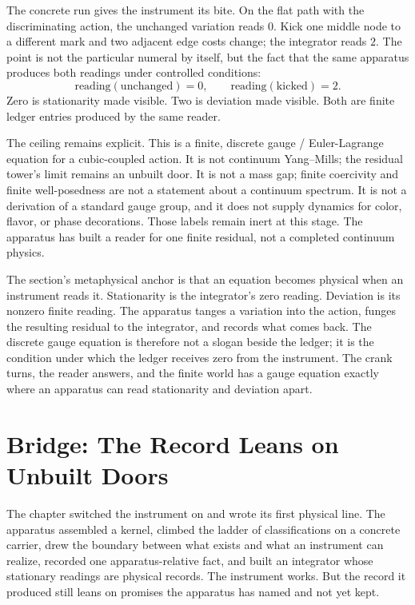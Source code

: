 The concrete run gives the instrument its bite. On the flat path with the
discriminating action, the unchanged variation reads \(0\). Kick one middle
node to a different mark and two adjacent edge costs change; the
integrator reads \(2\). The point is not the particular numeral by itself, but
the fact that the same apparatus produces both readings under controlled
conditions:
\[
  \mathrm{reading}(\mathrm{unchanged})=0,
  \qquad
  \mathrm{reading}(\mathrm{kicked})=2.
\]
Zero is stationarity made visible. Two is deviation made visible. Both are
finite ledger entries produced by the same reader.

The ceiling remains explicit. This is a finite, discrete gauge /
Euler-Lagrange equation for a cubic-coupled action. It is not continuum
Yang--Mills; the residual tower's limit remains an unbuilt door. It is not a
mass gap; finite coercivity and finite well-posedness are not a statement about
a continuum spectrum. It is not a derivation of a standard gauge group, and it
does not supply dynamics for color, flavor, or phase decorations. Those labels
remain inert at this stage. The apparatus has built a reader for one finite
residual, not a completed continuum physics.

The section's metaphysical anchor is that an equation becomes physical when an
instrument reads it. Stationarity is the integrator's zero reading. Deviation
is its nonzero finite reading. The apparatus tanges a variation into the action,
funges the resulting residual to the integrator, and records what comes back.
The discrete gauge equation is therefore not a slogan beside the ledger; it is
the condition under which the ledger receives zero from the instrument. The
crank turns, the reader answers, and the finite world has a gauge equation
exactly where an apparatus can read stationarity and deviation apart.

\section*{Bridge: The Record Leans on Unbuilt Doors}

The chapter switched the instrument on and wrote its first physical line. The
apparatus assembled a kernel, climbed the ladder of classifications on a concrete
carrier, drew the boundary between what exists and what an instrument can realize,
recorded one apparatus-relative fact, and built an integrator whose stationary
readings are physical records. The instrument works. But the record it produced still
leans on promises the apparatus has named and not yet kept.

